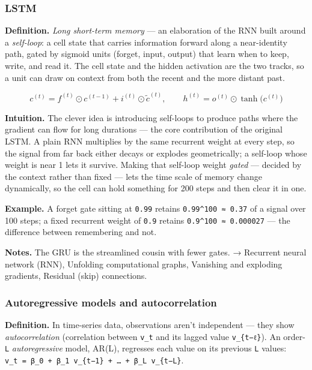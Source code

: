 \documentclass[
  10pt,
  letterpaper,
  onecolumn]{article}
\begin{document}
\hypertarget{lstm}{%
\subsubsection{LSTM}\label{lstm}}

\textbf{Definition.} \emph{Long short-term memory} --- an elaboration of
the RNN built around a \emph{self-loop}: a cell state that carries
information forward along a near-identity path, gated by sigmoid units
(forget, input, output) that learn when to keep, write, and read it. The
cell state and the hidden activation are the two tracks, so a unit can
draw on context from both the recent and the more distant past.

\begin{equation*}
c^{(t)}=f^{(t)}\odot c^{(t-1)}+i^{(t)}\odot\tilde c^{(t)},
\qquad
h^{(t)}=o^{(t)}\odot\tanh\bigl(c^{(t)}\bigr)
\end{equation*}

\textbf{Intuition.} The clever idea is introducing self-loops to produce
paths where the gradient can flow for long durations --- the core
contribution of the original LSTM. A plain RNN multiplies by the same
recurrent weight at every step, so the signal from far back either
decays or explodes geometrically; a self-loop whose weight is near 1
lets it survive. Making that self-loop weight \emph{gated} --- decided
by the context rather than fixed --- lets the time scale of memory
change dynamically, so the cell can hold something for 200 steps and
then clear it in one.

\textbf{Example.} A forget gate sitting at \texttt{0.99} retains
\texttt{0.99\^{}100\ ≈\ 0.37} of a signal over 100 steps; a fixed
recurrent weight of \texttt{0.9} retains
\texttt{0.9\^{}100\ ≈\ 0.000027} --- the difference between remembering
and not.

\textbf{Notes.} The GRU is the streamlined cousin with fewer gates. →
Recurrent neural network (RNN), Unfolding computational graphs,
Vanishing and exploding gradients, Residual (skip) connections.

\hypertarget{autoregressive-models-and-autocorrelation}{%
\subsubsection{Autoregressive models and
autocorrelation}\label{autoregressive-models-and-autocorrelation}}

\textbf{Definition.} In time-series data, observations aren't
independent --- they show \emph{autocorrelation} (correlation between
\texttt{v\_t} and its lagged value \texttt{v\_\{t−ℓ\}}). An
order-\texttt{L} \emph{autoregressive} model, AR(L), regresses each
value on its previous \texttt{L} values:
\texttt{v\_t\ =\ β\_0\ +\ β\_1\ v\_\{t−1\}\ +\ …\ +\ β\_L\ v\_\{t−L\}}.
\end{document}
